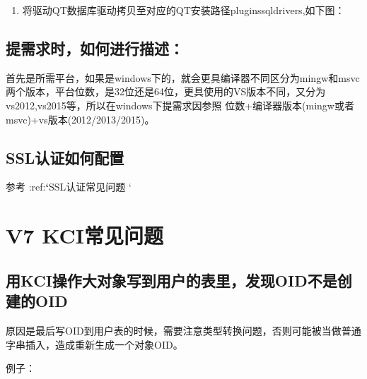 \documentclass[a4,10pt,oneside,english]{sphinxmanual}
\begin{document}
\begin{figure}[H]
\centering

\noindent{}
\end{figure}
\begin{enumerate}
%
\setcounter{enumi}{1}
\item {} 
将驱动QT数据库驱动拷贝至对应的QT安装路径pluginssqldrivers,如下图：

\end{enumerate}

\begin{figure}[H]
\centering

\noindent{}
\end{figure}


\subsection{提需求时，如何进行描述：}
\label{\detokenize{interface/qt:id1}}
首先是所需平台，如果是windows下的，就会更具编译器不同区分为mingw和msvc两个版本，平台位数，是32位还是64位，更具使用的VS版本不同，又分为vs2012,vs2015等，所以在windows下提需求因参照 位数+编译器版本(mingw或者msvc)+vs版本(2012/2013/2015)。


\subsection{SSL认证如何配置}
\label{\detokenize{interface/qt:ssl}}
参考 :ref:{\color{red}\bfseries{}`}SSL认证常见问题 `


\section{V7 KCI常见问题}
\label{\detokenize{interface/kci-v7:v7-kci}}\label{\detokenize{interface/kci-v7::doc}}

\subsection{用KCI操作大对象写到用户的表里，发现OID不是创建的OID}
\label{\detokenize{interface/kci-v7:kci-oidoid}}
原因是最后写OID到用户表的时候，需要注意类型转换问题，否则可能被当做普通字串插入，造成重新生成一个对象OID。

例子：

\begin{sphinxVerbatim}[commandchars=\\\{\}]
   
                      
\end{sphinxVerbatim}
\end{document}
